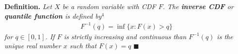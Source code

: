 \documentclass[11pt,a4paper]{report}
\begin{document}
\noindent \textbf{Definition.} \emph{Let $X$ be a random variable with
CDF $F$. The \textbf{inverse CDF} or \textbf{quantile function} is
defined by$^{4}$}
\begin{eqnarray*}
  F^{-1}(q) = \inf\{x : F(x) > q\}
\end{eqnarray*}
\emph{for $q \in [0,1]$. If $F$ is strictly increasing and continuous
  than $F^{-1}(q)$ is the unique real number $x$ such that $F(x) = q$}
$\blacksquare$\\
\end{document}
